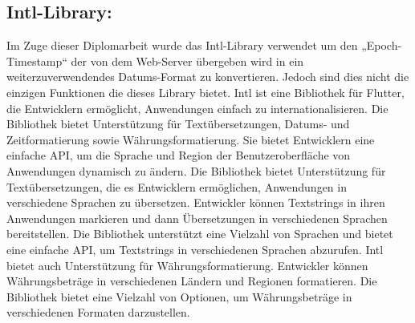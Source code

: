 \subsection*{Intl-Library:}
Im Zuge dieser Diplomarbeit wurde das Intl-Library verwendet um den „Epoch-Timestamp“ der von dem Web-Server übergeben wird in ein weiterzuverwendendes Datums-Format zu konvertieren. 
Jedoch sind dies nicht die einzigen Funktionen die dieses Library bietet.
\newline
Intl ist eine Bibliothek für Flutter, die Entwicklern ermöglicht, Anwendungen einfach zu internationalisieren. 
Die Bibliothek bietet Unterstützung für Textübersetzungen, Datums- und Zeitformatierung sowie Währungsformatierung. 
Sie bietet Entwicklern eine einfache API, um die Sprache und Region der Benutzeroberfläche von Anwendungen dynamisch zu ändern.
Die Bibliothek bietet Unterstützung für Textübersetzungen, die es Entwicklern ermöglichen, Anwendungen in verschiedene Sprachen zu übersetzen. 
Entwickler können Textstrings in ihren Anwendungen markieren und dann Übersetzungen in verschiedenen Sprachen bereitstellen. Die Bibliothek unterstützt eine Vielzahl von Sprachen und bietet eine einfache API, um Textstrings in verschiedenen Sprachen abzurufen. 
Intl bietet auch Unterstützung für Währungsformatierung. Entwickler können Währungsbeträge in verschiedenen Ländern und Regionen formatieren. 
Die Bibliothek bietet eine Vielzahl von Optionen, um Währungsbeträge in verschiedenen Formaten darzustellen.

